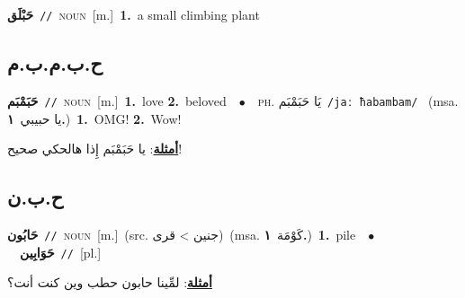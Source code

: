 \documentclass[10pt,a4paper,twoside]{article} %
\begin{document}
\begin{multicols}{2}
{{{{{{{{\setlength\topsep{0pt}\textbf{\foreignlanguage{arabic}{حَبْلَق}}\ {\color{gray}\texttt{//}\color{black}}\ \textsc{noun}\ [m.]\ \textbf{1.}~a small climbing plant\ 

\vspace{-3mm}
\subsection*{\color{blue}\foreignlanguage{arabic}{ح.ب.م.ب.م}\color{blue}{ (ntws)}} 

{\setlength\topsep{0pt}\textbf{\foreignlanguage{arabic}{حَبَمْبَم}}\ {\color{gray}\texttt{//}\color{black}}\ \textsc{noun}\ [m.]\ \textbf{1.}~love  \textbf{2.}~beloved\ \ $\bullet$\ \ \textsc{ph.} \color{gray} \foreignlanguage{arabic}{يَا حَبَمْبَم}\color{black}\ {\color{gray}\texttt{/{\sffamily jaː ħabambam}/}\color{black}}\ \color{gray} (msa. \foreignlanguage{arabic}{يا حبيبي}~\foreignlanguage{arabic}{\textbf{١.}})\color{black}\ \textbf{1.}~OMG!  \textbf{2.}~Wow!\  \begin{flushright}\color{gray}\foreignlanguage{arabic}{\textbf{\underline{\foreignlanguage{arabic}{أمثلة}}}: يا حَبَمْبَم إِذا هالحكي صحيح!}\end{flushright}\color{black}} \vspace{2mm}

\vspace{-3mm}
\subsection*{\color{blue}\foreignlanguage{arabic}{ح.ب.ن}\color{blue}{}} 

{\setlength\topsep{0pt}\textbf{\foreignlanguage{arabic}{حَابُون}}\ {\color{gray}\texttt{//}\color{black}}\ \textsc{noun}\ [m.]\ (src. \color{gray}\foreignlanguage{arabic}{جنين > قرى}\color{black})\ \color{gray}(msa. \foreignlanguage{arabic}{كَوْمَة}~\foreignlanguage{arabic}{\textbf{١.}})\color{black}\ \textbf{1.}~pile\ \ $\bullet$\ \ \setlength\topsep{0pt}\textbf{\foreignlanguage{arabic}{حَوَابِين}}\ {\color{gray}\texttt{//}\color{black}}\ [pl.]\  \begin{flushright}\color{gray}\foreignlanguage{arabic}{\textbf{\underline{\foreignlanguage{arabic}{أمثلة}}}: لمِّينا حابون حطب وين كنت أنت؟}\end{flushright}\color{black}} \vspace{2mm}

}}}}}}}}
\end{multicols}
\end{document}
